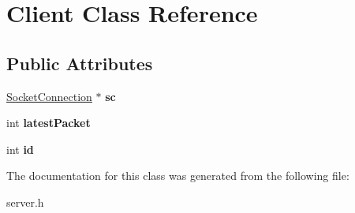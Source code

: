 \hypertarget{class_client}{\section{Client Class Reference}
\label{class_client}
}
\subsection*{Public Attributes}
\begin{DoxyCompactItemize}
\item 
\hypertarget{class_client_a6eedc226499b6504156da363c454cc78}{\hyperlink{class_socket_connection}{Socket\-Connection} $\ast$ {\bfseries sc}}\label{class_client_a6eedc226499b6504156da363c454cc78}

\item 
\hypertarget{class_client_a81ec429197b559ebdc8d41c5c44557a4}{int {\bfseries latest\-Packet}}\label{class_client_a81ec429197b559ebdc8d41c5c44557a4}

\item 
\hypertarget{class_client_ab79ad95264939f089a2f0b8e0ca62d37}{int {\bfseries id}}\label{class_client_ab79ad95264939f089a2f0b8e0ca62d37}

\end{DoxyCompactItemize}


The documentation for this class was generated from the following file\-:\begin{DoxyCompactItemize}
\item 
server.\-h\end{DoxyCompactItemize}

